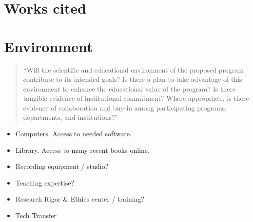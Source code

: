 \documentclass[pdftex,english,12pt,parskip=half]{scrartcl}
\begin{document}
\clearpage

\section{Works cited}




\clearpage

\section{Environment}

\begin{quotation}
``Will the scientific and educational environment of the proposed program contribute to its intended goals? Is there a plan to take advantage of this environment to enhance the educational value of the program? Is there tangible evidence of institutional commitment? Where appropriate, is there evidence of collaboration and buy-in among participating programs, departments, and institutions?"
\end{quotation}

\begin{itemize}
\item Computers. Access to needed software.
\item Library. Access to many recent books online.
\item Recording equipment / studio?
\item Teaching expertise?
\item Research Rigor \& Ethics center / training?
\item Tech Transfer
\end{itemize}
\end{document}
